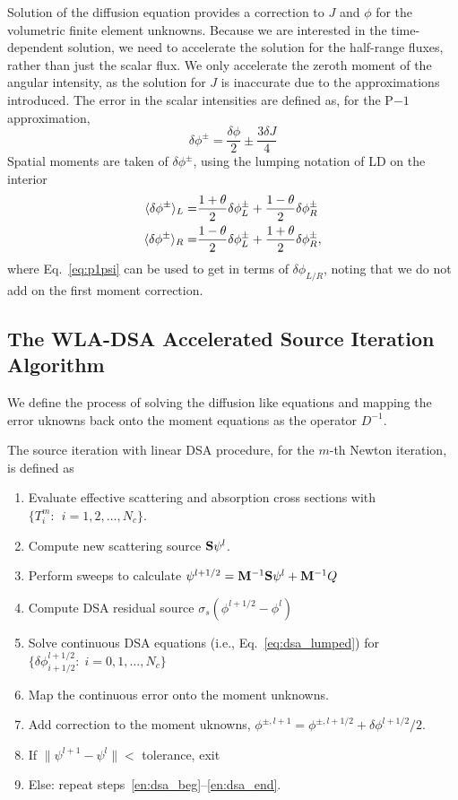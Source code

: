 Solution of the diffusion equation provides a correction to $J$ and $\phi$ for the volumetric finite element
unknowns. Because we are interested in the time-dependent solution, we need to accelerate the solution for the
half-range fluxes, rather than just the scalar flux. We only accelerate the zeroth
moment of the angular intensity, as the solution for $J$ is inaccurate due to the
approximations introduced.  The error in the scalar intensities are defined as, for the
P$-1$ approximation,
\begin{equation}\label{eq:p1psi}
    \delta \phi^{\pm} = \frac{\delta \phi}{2} \pm \frac{3 \delta J}{4}
\end{equation}
Spatial moments are taken of $\delta \phi^{\pm}$, using the lumping notation of LD on the interior
\begin{align}
    \langle \delta \phi^{\pm} \rangle_L =&  \frac{1+\theta}{2}\delta \phi^{\pm}_{L} +
    \frac{1-\theta}{2}\delta \phi^{\pm}_{R}  \\
    \langle \delta \phi^{\pm} \rangle_R =&  \frac{1-\theta}{2}\delta \phi^{\pm}_{L} +
    \frac{1+\theta}{2}\delta \phi^{\pm}_{R}      ,
\end{align}
where Eq.~\eqref{eq:p1psi} can be used to get in terms of $\delta \phi_{L/R}$, noting that
we do not add on the first moment correction.

\subsection{The WLA-DSA Accelerated Source Iteration Algorithm}

We define the process of solving the diffusion like equations and mapping the error
uknowns back onto the moment equations as the operator $D^{-1}$.

The source iteration with linear DSA procedure, for the $m$-th Newton iteration, is defined as
\begin{enumerate}
    \item Evaluate effective scattering and absorption cross sections with
        ${\{T^m_i:\;\, i=1,2,\ldots,N_c\}}$.
    \item\label{en:dsa_beg} Compute new scattering source $\mathbf{S} \psi^l$.
    \item Perform sweeps to calculate $\psi^{l+1/2} = \mathbf{M}^{-1} \mathbf{S}\psi^{l} + \mathbf{M}^{-1} Q$
    \item Compute DSA residual source $\sigma_s(\phi^{l+1/2}-\phi^l)$
    \item Solve continuous DSA equations (i.e., Eq.~\eqref{eq:dsa_lumped}) for ${\{\delta \phi^{l+1/2}_{i+1/2}:\;i=0,1,\ldots,N_c\}}$
    \item Map the continuous error onto the moment unknowns.
    \item Add correction to the moment uknowns, $\phi^{\pm,l+1} = \phi^{\pm,l+1/2} +
        \delta \phi^{l+1/2}/2$.
    \item\label{en:dsa_end} If $\|\psi^{l+1} - \psi^{l} \| < $ tolerance, exit
    \item Else: repeat steps~\ref{en:dsa_beg}--\ref{en:dsa_end}.
\end{enumerate}

